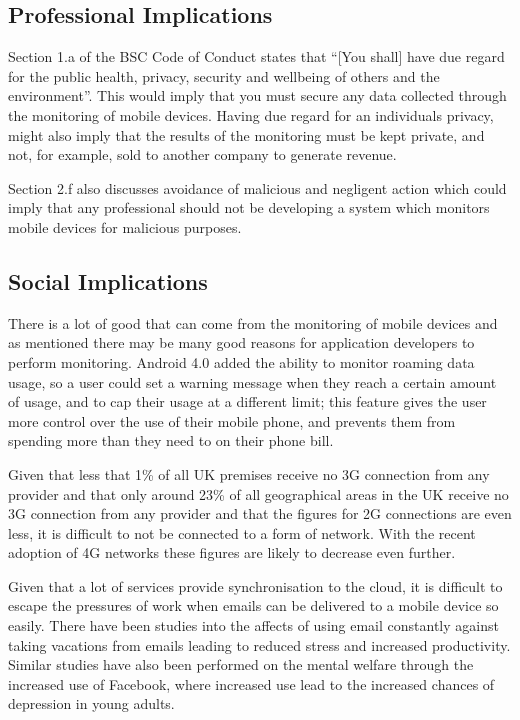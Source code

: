 \documentclass[12pt, a4paper]{article}
\begin{document}
\subsection{Professional Implications}

Section 1.a of the BSC Code of Conduct states that ``[You shall] have due regard
for the public health, privacy, security and wellbeing of others and the
environment''\cite{bsc2011conduct}. This would imply that you must secure any
data collected through the monitoring of mobile devices. Having due regard for
an individuals privacy, might also imply that the results of the monitoring must 
be kept private, and not, for example, sold to another company to generate
revenue.

Section 2.f also discusses avoidance of malicious and negligent action which
could imply that any professional should not be developing a system which
monitors mobile devices for malicious purposes.


\subsection{Social Implications}

There is a lot of good that can come from the monitoring of mobile devices and
as mentioned there may be many good reasons for application developers to
perform monitoring. Android 4.0 added the ability to monitor roaming data 
usage, so a user could set a warning message when they reach a certain amount 
of usage, and to cap their usage at a different limit\cite{android2011ics}; 
this feature gives the user more control over the use of their mobile phone, 
and prevents them from spending more than they need to on their phone bill.

Given that less that 1\% of all UK premises receive no 3G connection from any
provider and that only around 23\% of all geographical areas in the UK receive
no 3G connection from any provider\cite{offcom2013infastructure} and that the
figures for 2G connections are even less, it is difficult to not be connected
to a form of network. With the recent adoption of 4G networks these figures are
likely to decrease even further.

Given that a lot of services provide synchronisation to the cloud, it is
difficult to escape the pressures of work when emails can be delivered to a
mobile device so easily. There have been studies into the affects of using
email constantly against taking vacations from emails leading to reduced stress
and increased productivity\cite{mark2012pace}. Similar studies have also been
performed on the mental welfare through the increased use of
Facebook\cite{kross2013facebook}, where increased use lead to the increased
chances of depression in young adults.
\end{document}
